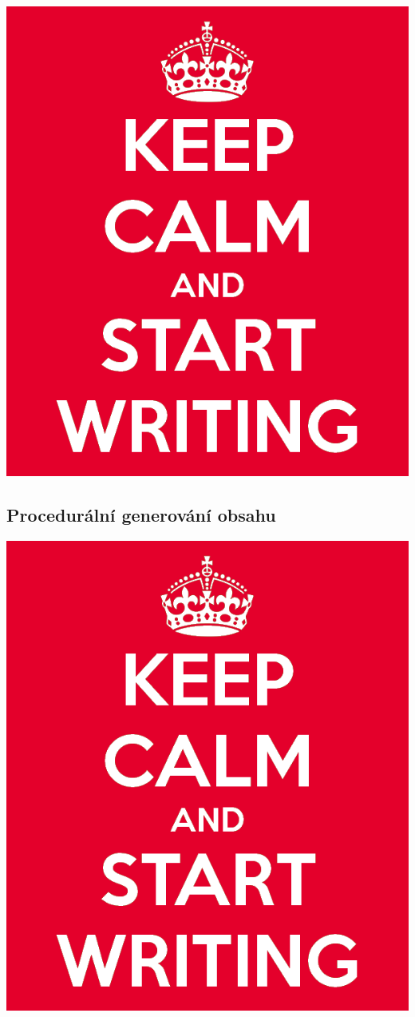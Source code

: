 \includegraphics[scale=0.3]{obrazky-figures/keep-calm.png}

\textcolor{gray}{\blindtext[5]}


\subsection{Procedurální generování obsahu}
\label{procedural}

\includegraphics[scale=0.3]{obrazky-figures/keep-calm.png}

